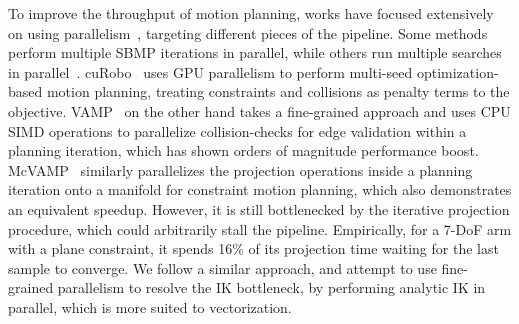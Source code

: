 \documentclass[letterpaper, 10 pt, conference]{ieeeconf}
\begin{document}
To improve the throughput of motion planning, works have focused extensively on using parallelism~\cite{amato1999probabilistic}, targeting different pieces of the pipeline. Some methods perform multiple SBMP iterations in parallel, while others run multiple searches in parallel~\cite{cforest}. cuRobo~\cite{sundaralingam2023curobo1} uses GPU parallelism to perform multi-seed optimization-based motion planning, treating constraints and collisions as penalty terms to the objective. VAMP~\cite{vamp} on the other hand takes a fine-grained approach and uses CPU SIMD operations to parallelize collision-checks for edge validation within a planning iteration, which has shown orders of magnitude performance boost. McVAMP~\cite{iyer2026vectorizing} similarly parallelizes the projection operations inside a planning iteration onto a manifold for constraint motion planning, which also demonstrates an equivalent speedup. However, it is still bottlenecked by the iterative projection procedure, which could arbitrarily stall the pipeline. Empirically, for a 7-DoF arm with a plane constraint, it spends 16\% of its projection time waiting for the last sample to converge.
We follow a similar approach, and attempt to use fine-grained parallelism to resolve the IK bottleneck, by performing analytic IK in parallel, which is more suited to vectorization.


\end{document}
